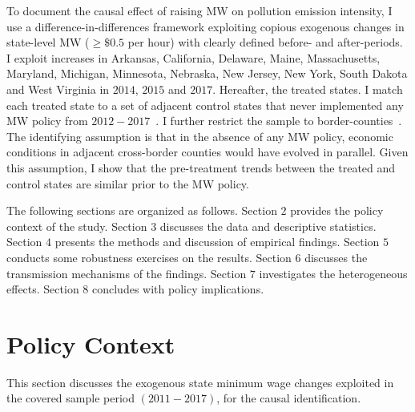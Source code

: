 \documentclass[12pt, english]{article}
\begin{document}
    To document the causal effect of raising MW on pollution emission intensity, I use a difference-in-differences framework exploiting copious exogenous changes in state-level MW ($\geq \$0.5$ per hour) with clearly defined before- and after-periods. I exploit increases in Arkansas, California, Delaware, Maine, Massachusetts, Maryland, Michigan, Minnesota, Nebraska, New Jersey, New York, South Dakota and West Virginia in $2014$, $2015$ and $2017$. Hereafter, the treated states. I match each treated state to a set of adjacent control states that never implemented any MW policy from $2012-2017$~\parencite{gopalan2021state}. I further restrict the sample to border-counties~\parencite{dube2010minimum}. The identifying assumption is that in the absence of any MW policy, economic conditions in adjacent cross-border counties would have evolved in parallel. Given this assumption, I show that the pre-treatment trends between the treated and control states are similar prior to the MW policy.



    The following sections are organized as follows. Section $2$ provides the policy context of the study. Section $3$ discusses the data and descriptive statistics. Section $4$ presents the methods and discussion of empirical findings. Section $5$ conducts some robustness exercises on the results. Section $6$ discusses the transmission mechanisms of the findings. Section $7$ investigates the heterogeneous effects. Section $8$ concludes with policy implications.


    \section{Policy Context}\label{sec:policy-context}
    This section discusses the exogenous state minimum wage changes exploited in the covered sample period $(2011-2017)$, for the causal identification.
\end{document}
